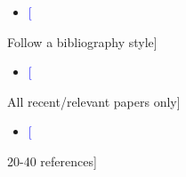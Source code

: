 \documentclass[runningheads]{llncs}
\newcommand\cci[1]{} %
\renewcommand\cci[1]{
        \par\noindent
        \begin{itemize}[nosep]
        \nointerlineskip
        \item \textcolor{blue}{#1}
        \end{itemize}
    }
\begin{document}


\maketitle              %
















\cci[Follow a bibliography style]
\cci[All recent/relevant papers only]
\cci[20-40 references]

% 
% 
\end{document}
